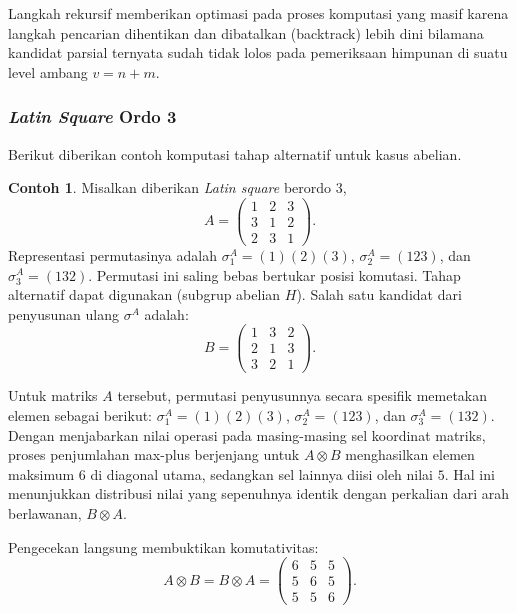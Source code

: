 \documentclass[journal]{IEEEtran}
\theoremstyle{definition}
\newtheorem{con}{Contoh}[section]
\theoremstyle{plain}
\begin{document}
Langkah rekursif memberikan optimasi pada proses komputasi yang masif karena langkah pencarian dihentikan dan dibatalkan (backtrack) lebih dini bilamana kandidat parsial ternyata sudah tidak lolos pada pemeriksaan himpunan di suatu level ambang $v = n+m$.

\subsubsection{\textit{Latin Square} Ordo 3}
Berikut diberikan contoh komputasi tahap alternatif untuk kasus abelian.
\begin{con}
    Misalkan diberikan \textit{Latin square} berordo $3$,
    \begin{equation}
        A=
        \begin{pmatrix}
            1 & 2 & 3 \\
            3 & 1 & 2 \\
            2 & 3 & 1
        \end{pmatrix}.
    \end{equation}
    Representasi permutasinya adalah $\sigma_1^A = (1)(2)(3)$, $\sigma_2^A = (123)$, dan $\sigma_3^A = (132)$. Permutasi ini saling bebas bertukar posisi komutasi. Tahap alternatif dapat digunakan (subgrup abelian $H$). Salah satu kandidat dari penyusunan ulang $\sigma^A$ adalah:
    \begin{equation}
        B=
        \begin{pmatrix}
            1 & 3 & 2 \\
            2 & 1 & 3 \\
            3 & 2 & 1
        \end{pmatrix}.
    \end{equation}

    Untuk matriks $A$ tersebut, permutasi penyusunnya secara spesifik memetakan elemen sebagai berikut: $\sigma_1^A = (1)(2)(3)$, $\sigma_2^A = (1 2 3)$, dan $\sigma_3^A = (1 3 2)$. Dengan menjabarkan nilai operasi pada masing-masing sel koordinat matriks, proses penjumlahan max-plus berjenjang untuk $A \otimes B$ menghasilkan elemen maksimum $6$ di diagonal utama, sedangkan sel lainnya diisi oleh nilai $5$. Hal ini menunjukkan distribusi nilai yang sepenuhnya identik dengan perkalian dari arah berlawanan, $B \otimes A$.

    Pengecekan langsung membuktikan komutativitas:
    \begin{equation}
        A\otimes B=B\otimes A=
        \begin{pmatrix}
            6 & 5 & 5 \\
            5 & 6 & 5 \\
            5 & 5 & 6
        \end{pmatrix}.
    \end{equation}
\end{con}
\end{document}
